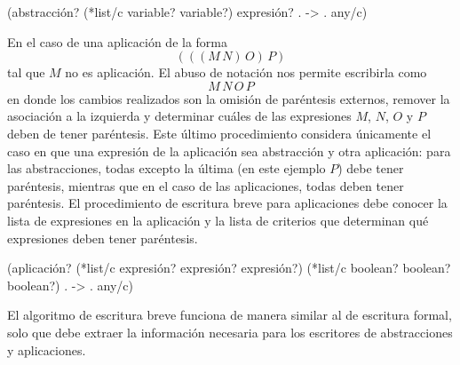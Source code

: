 \documentclass[10pt,oneside,openany,letterpaper]{book}
\begin{document}
\nwenddocs{}\endmoddef
(abstracción? (*list/c variable? variable?) expresión?
              . -> . any/c)
\nwendcode{}\nwdocspar

En el caso de una aplicación de la forma\[ (((M\, N)\, O)\, P) \]tal que \( M \) no es aplicación. El abuso de notación nos permite escribirla como\[ M\, N\, O\, P \]en donde los cambios realizados son la omisión de paréntesis externos, remover la asociación a la izquierda y determinar cuáles de las expresiones \( M \), \( N \), \( O \) y \( P \) deben de tener paréntesis. Este último procedimiento considera únicamente el caso en que una expresión de la aplicación sea abstracción y otra aplicación: para las abstracciones, todas excepto la última (en este ejemplo \( P \)) debe tener paréntesis, mientras que en el caso de las aplicaciones, todas deben tener paréntesis. El procedimiento de escritura breve para aplicaciones debe conocer la lista de expresiones en la aplicación y la lista de criterios que determinan qué expresiones deben tener paréntesis.

\nwenddocs{}\endmoddef
(aplicación? (*list/c expresión? expresión? expresión?)
             (*list/c boolean? boolean? boolean?)
             . -> . any/c)
\nwendcode{}\nwdocspar

El algoritmo de escritura breve funciona de manera similar al de escritura formal, solo que debe extraer la información necesaria para los escritores de abstracciones y aplicaciones.
\end{document}
